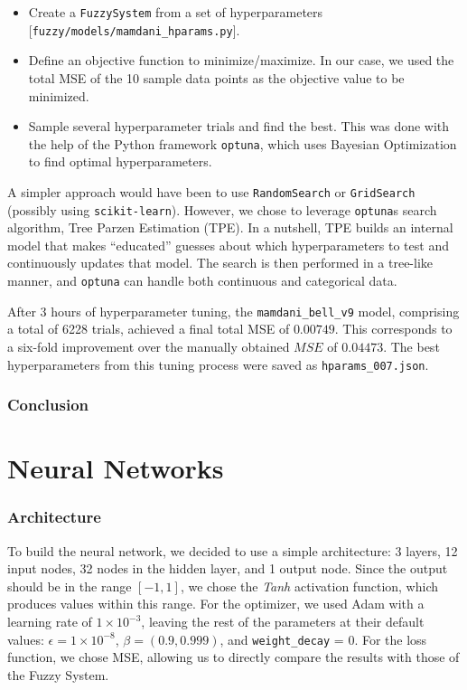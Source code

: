 \documentclass[titlepage]{article}
\newcommand*\apos{\textsc{\char13}}
\begin{document}
\begin{itemize}
    \item Create a \texttt{FuzzySystem} from a set of hyperparameters [\texttt{fuzzy/models/mamdani\_hparams.py}].
    \item Define an objective function to minimize/maximize.
          In our case, we used the total MSE of the 10 sample data points as the objective value to be minimized.
    \item Sample several hyperparameter trials and find the best.
          This was done with the help of the Python framework \texttt{optuna}, which uses Bayesian Optimization to find optimal hyperparameters.
\end{itemize}

A simpler approach would have been to use \texttt{RandomSearch} or \texttt{GridSearch} (possibly using \texttt{scikit-learn}).
However, we chose to leverage \texttt{optuna}\apos s search algorithm, Tree Parzen Estimation (TPE).
In a nutshell, TPE builds an internal model that makes ``educated'' guesses about which hyperparameters to test and continuously updates that model.
The search is then performed in a tree-like manner, and \texttt{optuna} can handle both continuous and categorical data.

After 3 hours of hyperparameter tuning, the \texttt{mamdani\_bell\_v9} model, comprising a total of 6228 trials, achieved a final total MSE of $0.00749$.
This corresponds to a six-fold improvement over the manually obtained $MSE$ of $0.04473$.
The best hyperparameters from this tuning process were saved as \texttt{hparams\_007.json}.


\section{Conclusion}


\part{Neural Networks}

\section{Architecture}

To build the neural network, we decided to use a simple architecture: 3 layers, 12 input nodes, 32 nodes in the hidden layer, and 1 output node.
Since the output should be in the range \([-1, 1]\), we chose the \emph{Tanh} activation function, which produces values within this range.
For the optimizer, we used Adam with a learning rate of $1 \times 10^{-3}$, leaving the rest of the parameters at their default values: $\epsilon = 1 \times 10^{-8}$, $\beta = (0.9, 0.999)$, and \texttt{weight\_decay} = 0.
For the loss function, we chose MSE, allowing us to directly compare the results with those of the Fuzzy System.
\end{document}
